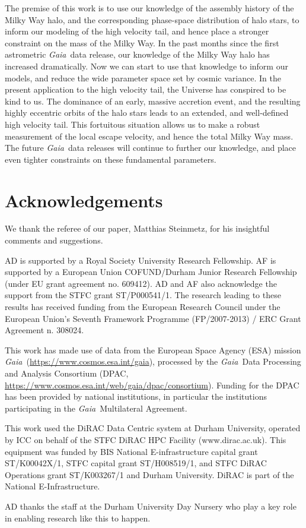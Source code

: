 \documentclass[fleqn,usenatbib]{mnras}
\newcommand{\gaia}		{\emph{Gaia}}
\begin{document}
\noindent
The premise of this work is to use our knowledge of the assembly history of the Milky Way halo, and the corresponding phase-space distribution of halo stars, to inform our modeling of the high velocity tail, and hence place a stronger constraint on the mass of the Milky Way. In the past months since the first astrometric \gaia\ data release, our knowledge of the Milky Way halo has increased dramatically. Now we can start to use that knowledge to inform our models, and reduce the wide parameter space set by cosmic variance. In the present application to the high velocity tail, the Universe has conspired to be kind to us. The dominance of an early, massive accretion event, and the resulting highly eccentric orbits of the halo stars leads to an extended, and well-defined high velocity tail. This fortuitous situation allows us to make a robust measurement of the local escape velocity, and hence the total Milky Way mass. The future \gaia\ data releases will continue to further our knowledge, and place even tighter constraints on these fundamental parameters.

\section*{Acknowledgements}
We thank the referee of our paper, Matthias Steinmetz, for his insightful comments and suggestions.

AD is supported by a Royal Society University Research Fellowship.  AF is supported by a European Union COFUND/Durham Junior Research Fellowship (under EU grant agreement no. 609412). AD and AF also
acknowledge the support from the STFC grant ST/P000541/1. The research leading to these
results has received funding from the European Research Council under
the European Union's Seventh Framework Programme (FP/2007-2013) / ERC
Grant Agreement n. 308024.

This work has made use of data from the European Space Agency (ESA) mission
\gaia\ (\url{https://www.cosmos.esa.int/gaia}), processed by the \gaia\
Data Processing and Analysis Consortium (DPAC,
\url{https://www.cosmos.esa.int/web/gaia/dpac/consortium}). Funding for the DPAC
has been provided by national institutions, in particular the institutions
participating in the \gaia\ Multilateral Agreement.

This work
used the DiRAC Data Centric system at Durham University, operated by
ICC on behalf of the STFC DiRAC HPC Facility (www.dirac.ac.uk). This
equipment was funded by BIS National E-infrastructure capital grant
ST/K00042X/1, STFC capital grant ST/H008519/1, and STFC DiRAC
Operations grant ST/K003267/1 and Durham University. DiRAC is part of
the National E-Infrastructure.

AD thanks the staff at the Durham University Day Nursery who play a key role in enabling research like this to happen.




\bsp	
\label{lastpage}
\end{document}
